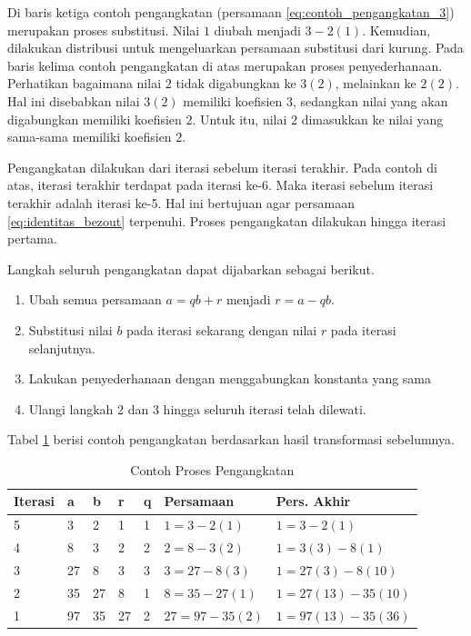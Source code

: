 Di baris ketiga contoh pengangkatan (persamaan \eqref{eq:contoh_pengangkatan_3}) merupakan proses substitusi. Nilai $ 1 $ diubah menjadi $ 3-2(1) $. Kemudian, dilakukan distribusi untuk mengeluarkan persamaan substitusi dari kurung. Pada baris kelima contoh pengangkatan di atas merupakan proses penyederhanaan. Perhatikan bagaimana nilai $ 2 $ tidak digabungkan ke $ 3(2) $, melainkan ke $ 2(2) $. Hal ini disebabkan nilai $ 3(2) $ memiliki koefisien $ 3 $, sedangkan nilai yang akan digabungkan memiliki koefisien $ 2 $. Untuk itu, nilai $ 2 $ dimasukkan ke nilai yang sama-sama memiliki koefisien $ 2 $.

Pengangkatan dilakukan dari iterasi sebelum iterasi terakhir. Pada contoh di atas, iterasi terakhir terdapat pada iterasi ke-6. Maka iterasi sebelum iterasi terakhir adalah iterasi ke-5. Hal ini bertujuan agar persamaan \eqref{eq:identitas_bezout} terpenuhi. Proses pengangkatan dilakukan hingga iterasi pertama.

Langkah seluruh pengangkatan dapat dijabarkan sebagai berikut.
\begin{enumerate}
\item Ubah semua persamaan $ a=qb+r $ menjadi $ r=a-qb $.
\item Substitusi nilai $ b $ pada iterasi sekarang dengan nilai $ r $ pada iterasi selanjutnya.
\item Lakukan penyederhanaan dengan menggabungkan konstanta yang sama
\item Ulangi langkah 2 dan 3 hingga seluruh iterasi telah dilewati.
\end{enumerate}

Tabel \ref{tab:pengangkatan_ext_euclid} berisi contoh pengangkatan berdasarkan hasil transformasi sebelumnya.

\begin{table}[h!]
\small
\Centering
\caption{Contoh Proses Pengangkatan}
\label{tab:pengangkatan_ext_euclid}
\begin{tabular} { |l|l|l|l|l|l|l| }
	\hline
	Iterasi	& a		& b		& r		& q		& Persamaan			& Pers. Akhir \\
	\hline
	5		& 3		& 2		& 1		& 1		& $ 1 = 3 - 2(1) $		& $ 1 = 3 - 2(1) $ \\
	4		& 8		& 3		& 2		& 2		& $ 2 = 8 - 3(2) $		& $ 1 = 3(3) - 8(1) $ \\
	3		& 27	& 8		& 3		& 3		& $ 3 = 27 - 8(3) $ 	& $ 1 = 27(3) - 8(10) $ \\
	2		& 35	& 27	& 8		& 1		& $ 8 = 35 - 27(1) $	& $ 1 = 27(13) - 35(10) $ \\
	1		& 97	& 35	& 27	& 2		& $ 27 = 97 - 35(2) $	& $ 1 = 97(13) - 35(36) $ \\
	\hline
\end{tabular}
\end{table}

